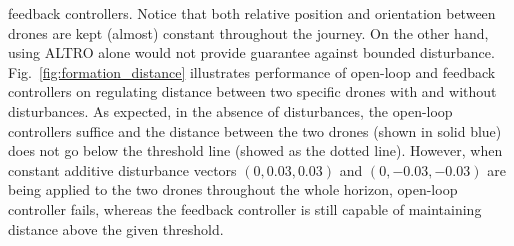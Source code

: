 feedback controllers. Notice that both 
relative position and orientation between drones are kept (almost) constant 
throughout the journey. 
On the other hand, using ALTRO alone would not provide guarantee against bounded disturbance. 
Fig.~\ref{fig:formation_distance} illustrates performance of open-loop and feedback controllers on regulating distance between two specific 
drones with and without disturbances. 
As expected, in the absence of disturbances, the open-loop controllers suffice and the distance between the two drones 
(shown in solid blue) does not go below the threshold line (showed as the dotted line). 
However, when constant additive disturbance vectors 
$(0 ,0.03,0.03)$ and $(0 ,-0.03,-0.03)$
are being applied to the two drones throughout the whole horizon, open-loop controller fails, 
whereas the feedback controller is still capable of maintaining distance above the given threshold.


